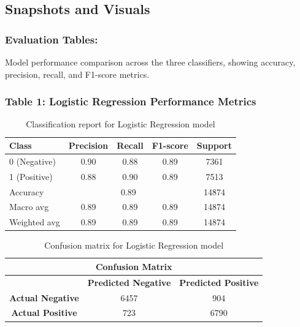 \documentclass{article}
\begin{document}
\newpage

\subsection{Snapshots and Visuals}
\subsubsection{Evaluation Tables:}
Model performance comparison across the three classifiers, showing accuracy, precision, recall, and F1-score metrics.

\subsubsection{Table 1: Logistic Regression Performance Metrics}
\begin{table}[H]
\centering
\begin{tabular}{|l|c|c|c|c|}
\hline
\textbf{Class} & \textbf{Precision} & \textbf{Recall} & \textbf{F1-score} & \textbf{Support} \\
\hline
0 (Negative) & 0.90 & 0.88 & 0.89 & 7361 \\
\hline
1 (Positive) & 0.88 & 0.90 & 0.89 & 7513 \\
\hline
\hline
Accuracy & \multicolumn{3}{c|}{0.89} & 14874 \\
\hline
Macro avg & 0.89 & 0.89 & 0.89 & 14874 \\
\hline
Weighted avg & 0.89 & 0.89 & 0.89 & 14874 \\
\hline
\end{tabular}
\caption{Classification report for Logistic Regression model}
\end{table}

\begin{table}[H]
\centering
\begin{tabular}{|c|c|c|}
\hline
\multicolumn{3}{|c|}{\textbf{Confusion Matrix}} \\
\hline
\textbf{} & \textbf{Predicted Negative} & \textbf{Predicted Positive} \\
\hline
\textbf{Actual Negative} & 6457 & 904 \\
\hline
\textbf{Actual Positive} & 723 & 6790 \\
\hline
\end{tabular}
\caption{Confusion matrix for Logistic Regression model}
\end{table}
\end{document}
